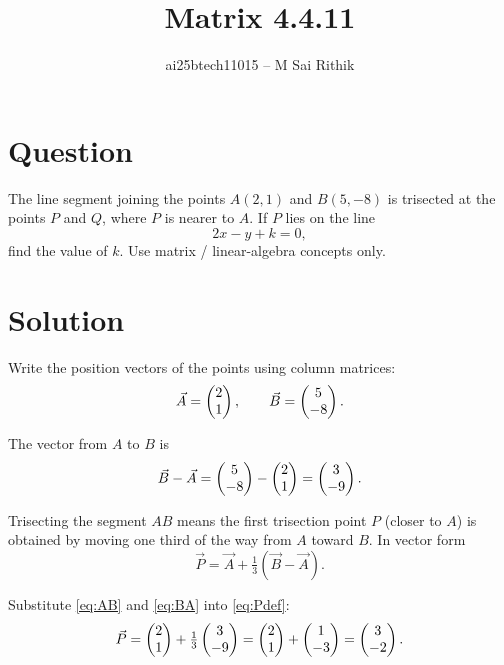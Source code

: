 \documentclass[12pt]{article}
\title{Matrix 4.4.11}
\author{ai25btech11015 -- M Sai Rithik}
\date{}
\begin{document}
\maketitle

\section*{Question}
The line segment joining the points \(A(2,1)\) and \(B(5,-8)\) is trisected at the points \(P\) and \(Q\), where \(P\) is nearer to \(A\). If \(P\) lies on the line
\[
2x - y + k = 0,
\]
find the value of \(k\). Use matrix / linear-algebra concepts only.

\section*{Solution}

Write the position vectors of the points using column matrices:
\begin{equation}
\Vec{A} = \begin{pmatrix}2 \\ 1\end{pmatrix}, \qquad \Vec{B} = \begin{pmatrix}5 \\ -8\end{pmatrix}.
\label{eq:AB}
\end{equation}

The vector from \(A\) to \(B\) is
\begin{equation}
\Vec{B}-\Vec{A} = \begin{pmatrix}5 \\ -8\end{pmatrix} - \begin{pmatrix}2 \\ 1\end{pmatrix} = \begin{pmatrix}3 \\ -9\end{pmatrix}.
\label{eq:BA}
\end{equation}

Trisecting the segment \(AB\) means the first trisection point \(P\) (closer to \(A\)) is obtained by moving one third of the way from \(A\) toward \(B\). In vector form
\begin{equation}
\Vec{P} = \Vec{A} + \tfrac{1}{3}(\Vec{B}-\Vec{A}).
\label{eq:Pdef}
\end{equation}

Substitute \eqref{eq:AB} and \eqref{eq:BA} into \eqref{eq:Pdef}:
\begin{equation}
\Vec{P} = \begin{pmatrix}2 \\ 1\end{pmatrix} + \tfrac{1}{3}\begin{pmatrix}3 \\ -9\end{pmatrix}
= \begin{pmatrix}2 \\ 1\end{pmatrix} + \begin{pmatrix}1 \\ -3\end{pmatrix}
= \begin{pmatrix}3 \\ -2\end{pmatrix}.
\label{eq:Pcoord}
\end{equation}
\end{document}
